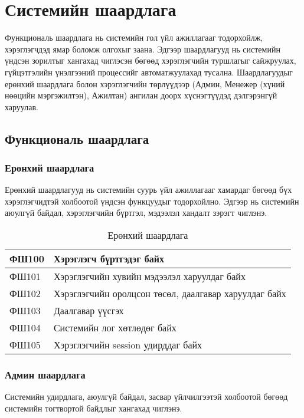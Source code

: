 \section{Системийн шаардлага}

Функциональ шаардлага нь системийн гол үйл ажиллагааг тодорхойлж, хэрэглэгчдэд ямар боломж олгохыг заана.
Эдгээр шаардлагууд нь системийн үндсэн зорилтыг хангахад чиглэсэн бөгөөд хэрэглэгчийн туршлагыг сайжруулах,
гүйцэтгэлийн үнэлгээний процессийг автоматжуулахад тусална. Шаардлагуудыг ерөнхий шаардлага болон хэрэглэгчийн
төрлүүдээр (Админ, Менежер (хүний нөөцийн мэргэжилтэн), Ажилтан) ангилан доорх хүснэгтүүдэд дэлгэрэнгүй харуулав.

\subsection{Функциональ шаардлага}
\subsubsection{Ерөнхий шаардлага}
Ерөнхий шаардлагууд нь системийн суурь үйл ажиллагааг хамардаг бөгөөд бүх хэрэглэгчидтэй холбоотой үндсэн 
функцуудыг тодорхойлно. Эдгээр нь системийн аюулгүй байдал, хэрэглэгчийн бүртгэл, мэдээлэл хандалт зэрэгт чиглэнэ.

\begin{table}[H]
    \centering
    \label{my-label}
    \begin{tabular}{|p{1.7cm}|p{12cm}|}
        \hline
          ФШ100 & Хэрэглэгч бүртгэдэг байх\\\hline
          ФШ101 & Хэрэглэгчийн хувийн мэдээлэл харуулдаг байх\\ \hline
          ФШ102 & Хэрэглэгчийн оролцсон төсөл, даалгавар харуулдаг байх \\\hline
          ФШ103 & Даалгавар үүсгэх \\ \hline
          ФШ104 & Системийн лог хөтлөдөг байх\\ \hline
          ФШ105 & Хэрэглэгчийн session удирддаг байх \\ \hline
    \end{tabular}
    \caption{Ерөнхий шаардлага}
\end{table}

\subsubsection{Админ шаардлага}
Системийн удирдлага, аюулгүй байдал, засвар үйлчилгээтэй холбоотой бөгөөд системийн тогтвортой байдлыг хангахад чиглэнэ.

